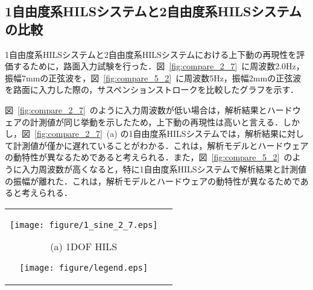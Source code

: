 \documentclass{article_vdlab_sotsuron_youshi}
\begin{document}
\subsection{1自由度系HILSシステムと2自由度系HILSシステムの比較}
1自由度系HILSシステムと2自由度系HILSシステムにおける上下動の再現性を評価するために，路面入力試験を行った．図~\ref{fig:compare_2_7}~に周波数2.0Hz，振幅7mmの正弦波を，図~\ref{fig:compare_5_2}~に周波数5Hz，振幅2mmの正弦波を路面に入力した際の，サスペンションストロークを比較したグラフを示す．\par
図~\ref{fig:compare_2_7}~のように入力周波数が低い場合は，解析結果とハードウェアの計測値が同じ挙動を示したため，上下動の再現性は高いと言える．しかし，図~\ref{fig:compare_2_7}~(a) の1自由度系HILSシステムでは，解析結果に対して計測値が僅かに遅れていることがわかる．これは，解析モデルとハードウェアの動特性が異なるためであると考えられる．また，図~\ref{fig:compare_5_2}~のように入力周波数が高くなると，特に1自由度系HILSシステムで解析結果と計測値の振幅が離れた．これは，解析モデルとハードウェアの動特性が異なるためであると考えられる．

\vspace*{2mm}
\hspace*{5mm}
\begin{tabular}{cc}
  \begin{minipage}{0.7\hsize}
    \begin{center} 
      \texttt{[image: figure/1\_sine\_2\_7.eps]}
      \end{center}
      \begin{center}
      \vspace*{-4mm}
      \ (a) 1DOF HILS\
    \end{center}
  \end{minipage}
  \hspace*{-12mm}
  \begin{minipage}{0.3\hsize}
    \texttt{[image: figure/legend.eps]}
  \end{minipage}
\end{tabular}
\end{document}
